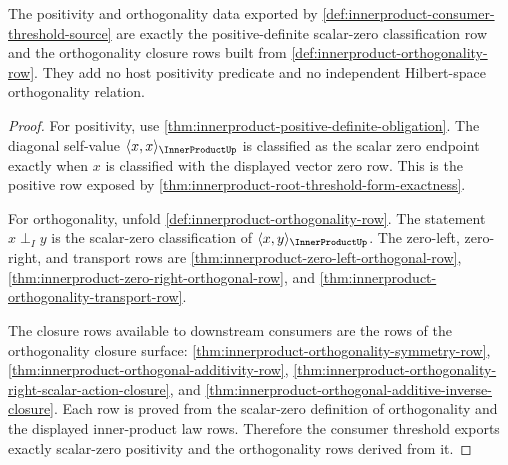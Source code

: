 \begin{theorem}
\label{thm:innerproduct-consumer-positive-orthogonality-scope}
The positivity and orthogonality data exported by
\autoref{def:innerproduct-consumer-threshold-source} are exactly the
positive-definite scalar-zero classification row and the orthogonality closure
rows built from \autoref{def:innerproduct-orthogonality-row}. They add no
host positivity predicate and no independent Hilbert-space orthogonality
relation.
\end{theorem}
\begin{proof}
For positivity, use
\autoref{thm:innerproduct-positive-definite-obligation}. The diagonal
self-value $\langle x,x\rangle_{\InnerProductUp}$ is classified as the scalar
zero endpoint exactly when $x$ is classified with the displayed vector zero
row. This is the positive row exposed by
\autoref{thm:innerproduct-root-threshold-form-exactness}.

For orthogonality, unfold
\autoref{def:innerproduct-orthogonality-row}. The statement $x\perp_I y$ is
the scalar-zero classification of
$\langle x,y\rangle_{\InnerProductUp}$. The zero-left, zero-right, and
transport rows are
\autoref{thm:innerproduct-zero-left-orthogonal-row},
\autoref{thm:innerproduct-zero-right-orthogonal-row}, and
\autoref{thm:innerproduct-orthogonality-transport-row}.

The closure rows available to downstream consumers are the rows of the
orthogonality closure surface:
\autoref{thm:innerproduct-orthogonality-symmetry-row},
\autoref{thm:innerproduct-orthogonal-additivity-row},
\autoref{thm:innerproduct-orthogonality-right-scalar-action-closure}, and
\autoref{thm:innerproduct-orthogonal-additive-inverse-closure}. Each row is
proved from the scalar-zero definition of orthogonality and the displayed
inner-product law rows. Therefore the consumer threshold exports exactly
scalar-zero positivity and the orthogonality rows derived from it.
\end{proof}

